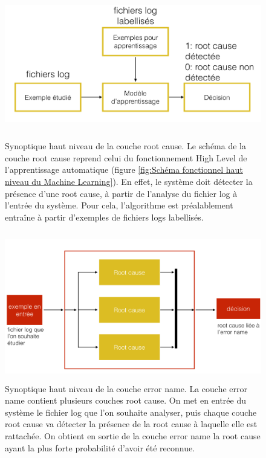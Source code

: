 \begin{figure}[h]
	\centering\includegraphics[height=6.5cm]{images/synoptique_root.png}
	\caption[Synoptique haut niveau de la couche root cause]{Synoptique haut niveau de la couche root cause. Le schéma de la couche root cause reprend celui du fonctionnement High Level de l'apprentissage automatique (figure \ref{fig:Schéma fonctionnel haut niveau du Machine Learning}). En effet, le système doit détecter la présence d'une root cause, à partir de l'analyse du fichier log à l'entrée du système. Pour cela, l'algorithme est préalablement entraîne à partir d'exemples de fichiers logs labellisés.}
	\label{fig:synoptique haut niveau de la solution proposée: couche root cause}
\end{figure}

\begin{figure}[h]
	\centering\includegraphics[height=6.5cm]{images/synoptique_error.png}
	\caption[Synoptique haut niveau de la couche error name]{Synoptique haut niveau de la couche error name. La couche error name contient plusieurs couches root cause. On met en entrée du système le fichier log que l'on souhaite analyser, puis chaque couche root cause va détecter la présence de la root cause à laquelle elle est rattachée. On obtient en sortie de la couche error name la root cause  ayant la plus forte probabilité d'avoir été reconnue.}
	\label{fig:synoptique haut niveau de la solution proposée: couche error name}
\end{figure}

